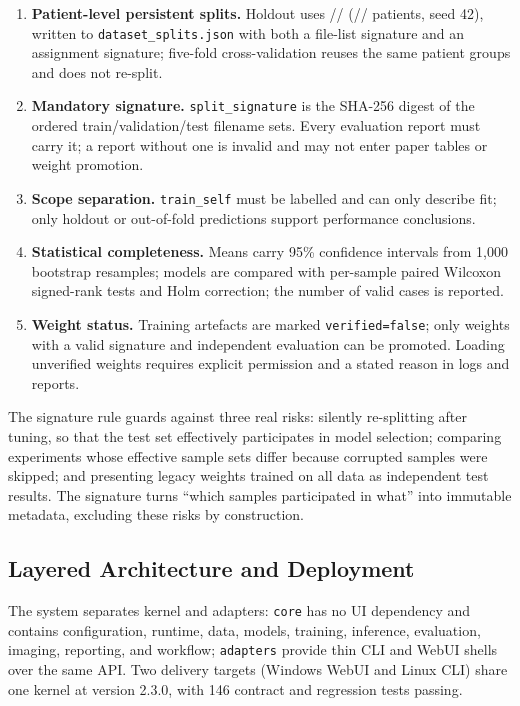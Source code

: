 \begin{enumerate}[label=\textbf{E\arabic*.}]
\item \textbf{Patient-level persistent splits.} Holdout uses \nTrain/\nVal/\nTest{} (\nTrainPatients/\nValPatients/\nTestPatients{} patients, seed 42), written to \texttt{dataset\_splits.json} with both a file-list signature and an assignment signature; five-fold cross-validation reuses the same patient groups and does not re-split.
\item \textbf{Mandatory signature.} \texttt{split\_signature} is the SHA-256 digest of the ordered train/validation/test filename sets. Every evaluation report must carry it; a report without one is invalid and may not enter paper tables or weight promotion.
\item \textbf{Scope separation.} \texttt{train\_self} must be labelled and can only describe fit; only holdout or out-of-fold predictions support performance conclusions.
\item \textbf{Statistical completeness.} Means carry 95\% confidence intervals from 1{,}000 bootstrap resamples; models are compared with per-sample paired Wilcoxon signed-rank tests and Holm correction; the number of valid cases is reported.
\item \textbf{Weight status.} Training artefacts are marked \texttt{verified=false}; only weights with a valid signature and independent evaluation can be promoted. Loading unverified weights requires explicit permission and a stated reason in logs and reports.
\end{enumerate}

The signature rule guards against three real risks: silently re-splitting after tuning, so that the test set effectively participates in model selection; comparing experiments whose effective sample sets differ because corrupted samples were skipped; and presenting legacy weights trained on all data as independent test results. The signature turns ``which samples participated in what'' into immutable metadata, excluding these risks by construction.

\subsection{Layered Architecture and Deployment}\label{sec:architecture}

The system separates kernel and adapters: \texttt{core} has no UI dependency and contains configuration, runtime, data, models, training, inference, evaluation, imaging, reporting, and workflow; \texttt{adapters} provide thin CLI and WebUI shells over the same API. Two delivery targets (Windows WebUI and Linux CLI) share one kernel at version 2.3.0, with 146 contract and regression tests passing.

